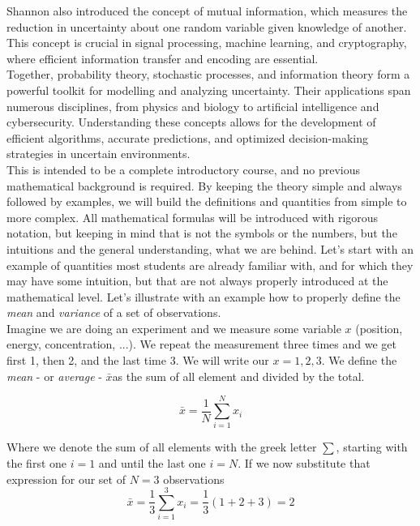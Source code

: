 \documentclass{book}
\begin{document}
Shannon also introduced the concept of mutual information, which measures the reduction in uncertainty about one random variable given knowledge of another. This concept is crucial in signal processing, machine learning, and cryptography, where efficient information transfer and encoding are essential.\\

Together, probability theory, stochastic processes, and information theory form a powerful toolkit for modelling and analyzing uncertainty. Their applications span numerous disciplines, from physics and biology to artificial intelligence and cybersecurity. Understanding these concepts allows for the development of efficient algorithms, accurate predictions, and optimized decision-making strategies in uncertain environments.\\

	This is intended to be a complete introductory course, and no previous mathematical background is required. By keeping the theory simple and always followed by examples, we will build the definitions and quantities from simple to more complex. All mathematical formulas will be introduced with rigorous notation, but keeping in mind that is not the symbols or the numbers, but the intuitions and the general understanding, what we are behind. Let's start with an example of quantities most students are already familiar with, and for which they may have some intuition, but that are not always properly introduced at the mathematical level. Let's illustrate with an example how to properly define the \textit{mean} and \textit{variance} of a set of observations.\\
	
	Imagine we are doing an experiment and we measure some variable $x$ (position, energy, concentration, ...). We repeat the measurement three times and we get first 1, then 2, and the last time 3. We will write our $x = {1, 2, 3}$. We define the \textit{mean} - or \textit{average} - $\bar{x}$as the sum of all element and divided by the total.

\begin{equation}
\bar{x} = \frac{1}{N} \sum_{i = 1}^{N} x_{i}
\end{equation}

Where we denote the sum of all elements with the greek letter $\sum$, starting with the first one $i = 1$ and until the last one $i = N$. If we now substitute that expression for our set of $N = 3$ observations
\begin{equation}
\bar{x} = \frac{1}{3} \sum_{i = 1}^{3} x_{i} = \frac{1}{3} (1 + 2 + 3) = 2
\end{equation}
\end{document}

